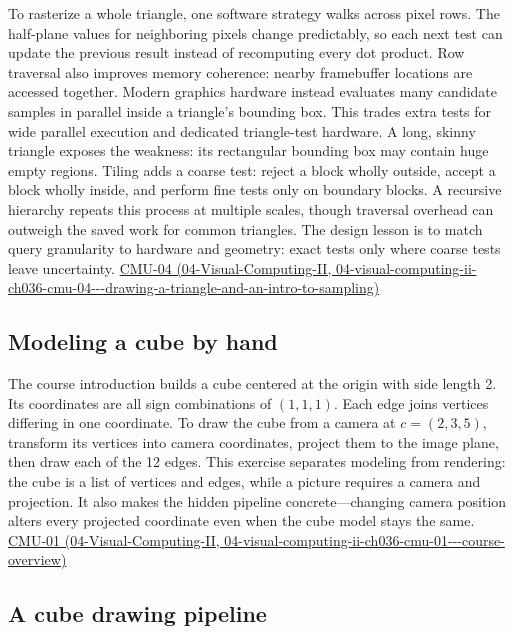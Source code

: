 To rasterize a whole triangle, one software strategy walks across pixel rows. The half-plane values for neighboring pixels change predictably, so each next test can update the previous result instead of recomputing every dot product. Row traversal also improves memory coherence: nearby framebuffer locations are accessed together. Modern graphics hardware instead evaluates many candidate samples in parallel inside a triangle's bounding box. This trades extra tests for wide parallel execution and dedicated triangle-test hardware. A long, skinny triangle exposes the weakness: its rectangular bounding box may contain huge empty regions. Tiling adds a coarse test: reject a block wholly outside, accept a block wholly inside, and perform fine tests only on boundary blocks. A recursive hierarchy repeats this process at multiple scales, though traversal overhead can outweigh the saved work for common triangles. The design lesson is to match query granularity to hardware and geometry: exact tests only where coarse tests leave uncertainty. \href{../04-Visual-Computing-II/main.pdf\#nameddest=04-visual-computing-ii-ch036-cmu-04---drawing-a-triangle-and-an-intro-to-sampling}{CMU-04 (04-Visual-Computing-II, 04-visual-computing-ii-ch036-cmu-04-\/-\/-drawing-a-triangle-and-an-intro-to-sampling)}

\subsection{Modeling a cube by hand}\label{03-visual-computing-i-ch015-modeling-a-cube-by-hand}

The course introduction builds a cube centered at the origin with side length 2. Its coordinates are all sign combinations of \((1,1,1)\). Each edge joins vertices differing in one coordinate. To draw the cube from a camera at \(c=(2,3,5)\), transform its vertices into camera coordinates, project them to the image plane, then draw each of the 12 edges. This exercise separates modeling from rendering: the cube is a list of vertices and edges, while a picture requires a camera and projection. It also makes the hidden pipeline concrete---changing camera position alters every projected coordinate even when the cube model stays the same. \href{../04-Visual-Computing-II/main.pdf\#nameddest=04-visual-computing-ii-ch036-cmu-01---course-overview}{CMU-01 (04-Visual-Computing-II, 04-visual-computing-ii-ch036-cmu-01-\/-\/-course-overview)}

\subsection{A cube drawing pipeline}\label{03-visual-computing-i-ch015-a-cube-drawing-pipeline}

